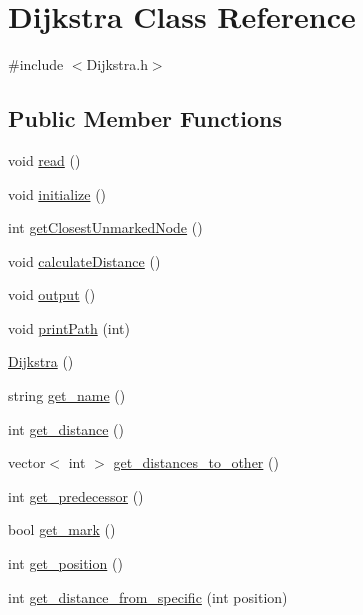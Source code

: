 \hypertarget{class_dijkstra}{\section{Dijkstra Class Reference}
\label{class_dijkstra}
}


{\ttfamily \#include $<$Dijkstra.\-h$>$}

\subsection*{Public Member Functions}
\begin{DoxyCompactItemize}
\item 
void \hyperlink{class_dijkstra_a17070869ad646e4ac13a656b6f9adea4}{read} ()
\item 
void \hyperlink{class_dijkstra_a0f7f7f26abbe38dc975d1b73da1fd352}{initialize} ()
\item 
int \hyperlink{class_dijkstra_aa9df7dd7756870a4bb5ed14abfa93124}{get\-Closest\-Unmarked\-Node} ()
\item 
void \hyperlink{class_dijkstra_a110ea0c1486bf76fecec005f1eea56d0}{calculate\-Distance} ()
\item 
void \hyperlink{class_dijkstra_a267c5426563ba083712d16115bdf363b}{output} ()
\item 
void \hyperlink{class_dijkstra_a45305244759e1634249dc04438c3e207}{print\-Path} (int)
\item 
\hyperlink{class_dijkstra_ad7c7bb035ef96e4dbd652fe2bd11a2be}{Dijkstra} ()
\item 
string \hyperlink{class_dijkstra_a2673be1aaa7fbae0656239e66a855134}{get\-\_\-name} ()
\item 
int \hyperlink{class_dijkstra_af1d9287898152d9581fae471af19cf78}{get\-\_\-distance} ()
\item 
vector$<$ int $>$ \hyperlink{class_dijkstra_acd3b982f95ee25ed09184bb0da75f0b7}{get\-\_\-distances\-\_\-to\-\_\-other} ()
\item 
int \hyperlink{class_dijkstra_ad05e5384c101f91eded657061d1d9c30}{get\-\_\-predecessor} ()
\item 
bool \hyperlink{class_dijkstra_a1351e93ccbbfef5f0ce6dab8d4df2ac0}{get\-\_\-mark} ()
\item 
int \hyperlink{class_dijkstra_ab067a351a7c993cb900f64495e49aa4c}{get\-\_\-position} ()
\item 
int \hyperlink{class_dijkstra_af9bcc9baee081c08a7e192781788284f}{get\-\_\-distance\-\_\-from\-\_\-specific} (int position)
\item 

\end{DoxyCompactItemize}
